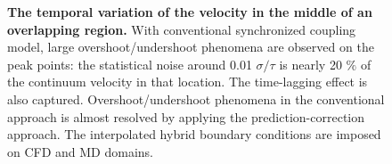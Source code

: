 \documentclass[preprint,12pt]{elsarticle}
\begin{document}
\begin{figure}
\centering
{}
\hskip 1cm
\vskip-0.2cm
\caption[]{\small {\bf The temporal variation of the velocity in the middle of an overlapping region.}
 With conventional synchronized coupling model,
large overshoot/undershoot phenomena are observed on the peak points:
the statistical noise around 0.01 $\sigma/\tau$ is nearly 20 $\%$ of the
continuum velocity in that location. The time-lagging effect is also captured.
 Overshoot/undershoot phenomena in the conventional
approach is almost resolved by applying the prediction-correction approach.
The interpolated hybrid boundary conditions are imposed on CFD and MD domains.}
\label{Temporal1}
\end{figure}
\end{document}
